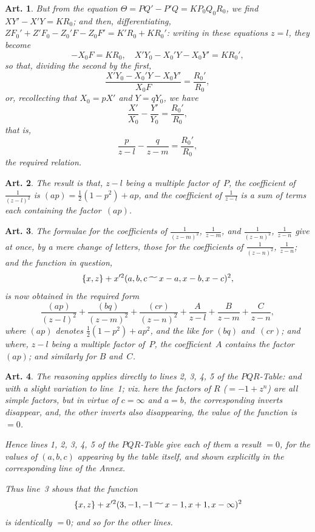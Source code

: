 \documentclass[11pt,a4paper]{article}
\theoremstyle{plain}
\newtheorem{art}{Art.}[section]
\begin{document}
\begin{art}
But from the equation $\Theta = PQ' - P'Q = KP_0 Q_0 R_0$, we find
$XY' - X'Y = KR_0$; and then, differentiating,
$ZF_0' + Z'F_0 - Z_0'F - Z_0F' = K'R_0 + KR_0'$: writing in these equations
$z = l$, they become
\[
-X_0 F = KR_0, \quad X'Y_0 - X_0'Y - X_0 Y' = KR_0',
\]
so that, dividing the second by the first,
\[
\frac{X'Y_0 - X_0'Y - X_0 Y'}{X_0 F} = \frac{R_0'}{R_0},
\]
or, recollecting that $X_0 = pX'$ and $Y = qY_0$, we have
\[
\frac{X'}{X_0} - \frac{Y'}{Y_0} = \frac{R_0'}{R_0},
\]
that is,
\[
\frac{p}{z-l} - \frac{q}{z-m} = \frac{R_0'}{R_0},
\]
the required relation.
\end{art}

\begin{art}
The result is that, $z-l$ being a multiple factor of~$P$, the coefficient
of $\frac{1}{(z-l)^2}$ is $(ap) = \frac{1}{2}(1-p^2) + ap$, and the coefficient
of $\frac{1}{z-l}$ is a sum of terms each containing the factor~$(ap)$.
\end{art}

\begin{art}
The formulae for the coefficients of $\frac{1}{(z-m)^2}$, $\frac{1}{z-m}$, and
$\frac{1}{(z-n)^2}$, $\frac{1}{z-n}$ give at once, by a mere change of letters,
those for the coefficients of $\frac{1}{(z-n)^2}$, $\frac{1}{z-n}$; and the
function in question,
\[
\{x, z\} + x'^2 (a, b, c \,\raisebox{-.5ex}{$\widetilde{\phantom{aa}}$}\, x-a, x-b, x-c)^2,
\]
is now obtained in the required form
\[
\frac{(ap)}{(z-l)^2} + \frac{(bq)}{(z-m)^2} + \frac{(cr)}{(z-n)^2}
+ \frac{A}{z-l} + \frac{B}{z-m} + \frac{C}{z-n},
\]
where $(ap)$ denotes $\frac{1}{2}(1-p^2) + ap^2$, and the like for $(bq)$ and~$(cr)$;
and where, $z-l$ being a multiple factor of~$P$, the coefficient~$A$ contains
the factor~$(ap)$; and similarly for $B$ and~$C$.
\end{art}


\begin{art}
The reasoning applies directly to lines 2, 3, 4, 5 of the $PQR$-Table:
and with a slight variation to line~1; viz. here the factors of $R$
($= -1 + z^n$) are all simple factors, but in virtue of $c = \infty$ and
$a = b$, the corresponding inverts disappear, and, the other inverts also
disappearing, the value of the function is $=0$.

Hence lines 1, 2, 3, 4, 5 of the $PQR$-Table give each of them a result
$=0$, for the values of $(a, b, c)$ appearing by the table itself, and shown
explicitly in the corresponding line of the Annex.

Thus line~3 shows that the function
\[
\{x, z\} + x'^2 (3, -1, -1 \,\raisebox{-.5ex}{$\widetilde{\phantom{aa}}$}\, x-1, x+1, x-\infty)^2
\]
is identically $=0$; and so for the other lines.
\end{art}
\end{document}
